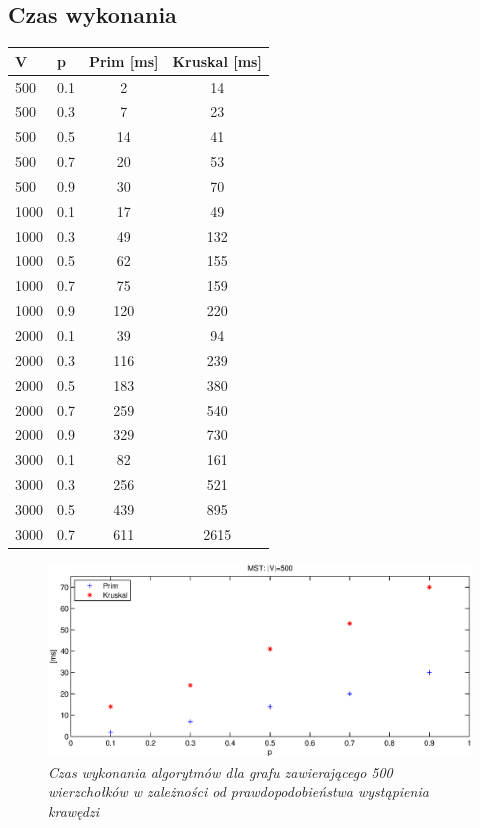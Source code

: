 \documentclass[a4paper, 10pt]{article}
\begin{document}
\subsection{Czas wykonania}

\begin{center}
    \begin{tabular}{| l | l | c | c |}
    \hline
    V & p & Prim [ms] & Kruskal [ms] \\ \hline
	500 & 0.1 & 2 & 14  \\ 
	500 & 0.3 & 7& 23  \\ 
	500 & 0.5 & 14& 41  \\ 
	500 & 0.7 & 20& 53  \\ 
	500 & 0.9 & 30& 70  \\ \hline
	1000 & 0.1 & 17& 49  \\ 
	1000 & 0.3 & 49& 132  \\ 
	1000 & 0.5 & 62& 155 \\ 
	1000 & 0.7 & 75& 159 \\ 
	1000 & 0.9 & 120& 220  \\ \hline
	2000 & 0.1 & 39& 94  \\ 
	2000 & 0.3 & 116& 239  \\ 
	2000 & 0.5 & 183& 380  \\ 
	2000 & 0.7 & 259& 540  \\ 
	2000 & 0.9 & 329& 730  \\ \hline
	3000 & 0.1 & 82& 161\\ 
	3000 & 0.3 & 256& 521  \\ 
	3000 & 0.5 & 439& 895  \\ 
	3000 & 0.7 & 611& 2615  \\ \hline
    \end{tabular}
\end{center}



\begin{figure}[ht!]
\centering
\includegraphics[width=165mm]{wykresy/v500.eps}
\caption{\it{Czas wykonania algorytmów dla grafu zawierającego 500 wierzchołków w zależności od prawdopodobieństwa wystąpienia krawędzi}}
\label{overflow}
\end{figure}
\end{document}
